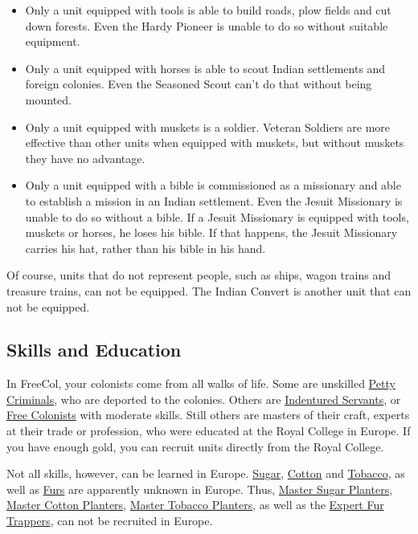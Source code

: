 \documentclass[12pt]{article}
\begin{document}
\begin{itemize}
\item Only a unit equipped with tools is able to build roads, plow
  fields and cut down forests. Even the Hardy Pioneer is unable to do
  so without suitable equipment.

\item Only a unit equipped with horses is able to scout Indian
  settlements and foreign colonies. Even the Seasoned Scout can't do
  that without being mounted.

\item Only a unit equipped with muskets is a soldier. Veteran Soldiers
  are more effective than other units when equipped with muskets, but
  without muskets they have no advantage.

\item Only a unit equipped with a bible is commissioned as a
  missionary and able to establish a mission in an Indian
  settlement. Even the Jesuit Missionary is unable to do so without a
  bible. If a Jesuit Missionary is equipped with tools, muskets or
  horses, he loses his bible. If that happens, the Jesuit Missionary
  carries his hat, rather than his bible in his hand.
\end{itemize}

Of course, units that do not represent people, such as ships, wagon
trains and treasure trains, can not be equipped. The Indian Convert is
another unit that can not be equipped.


\hypertarget{Skills and Education}{\subsection{Skills and Education}}

In FreeCol, your colonists come from all walks of life. Some are
unskilled \hyperlink{Petty Criminal}{Petty Criminals}, who are
deported to the colonies. Others are \hyperlink{Indentured
Servant}{Indentured Servants}, or \hyperlink{Free Colonist}{Free
Colonists} with moderate skills. Still others are masters of their
craft, experts at their trade or profession, who were educated at the
Royal College in Europe. If you have enough gold, you can recruit
units directly from the Royal College.

Not all skills, however, can be learned in Europe.
\hyperlink{Sugar}{Sugar}, \hyperlink{Cotton}{Cotton} and
\hyperlink{Tobacco}{Tobacco}, as well as \hyperlink{Furs}{Furs} are
apparently unknown in Europe. Thus, \hyperlink{Master Sugar
Planter}{Master Sugar Planters}, \hyperlink{Master Cotton
Planter}{Master Cotton Planters}, \hyperlink{Master Tobacco
Planter}{Master Tobacco Planters}, as well as the \hyperlink{Expert
Fur Trapper}{Expert Fur Trappers}, can not be recruited in Europe.
\end{document}
